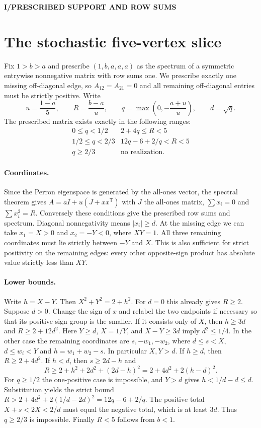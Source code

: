 \documentclass[11pt,a4paper]{article}
\newcommand{\kicker}[1]{\par{\sffamily\bfseries\color{teal}\small #1}\par}
\begin{document}
\clearpage
{}
\kicker{I\quad /\quad PRESCRIBED SUPPORT AND ROW SUMS}
\section*{The stochastic five-vertex slice}
Fix $1>b>a$ and prescribe $(1,b,a,a,a)$ as the spectrum of a symmetric
entrywise nonnegative matrix with row sums one. We prescribe exactly one
missing off-diagonal edge, so $A_{12}=A_{21}=0$ and all remaining
off-diagonal entries must be strictly positive. Write
\[
 u=\frac{1-a}{5},\qquad R=\frac{b-a}{u},\qquad
 q=\max\left(0,-\frac{a+u}{u}\right),\qquad d=\sqrt q.
\]
The prescribed matrix exists exactly in the following ranges:
\[
\begin{array}{c|l}
 0\le q<1/2 & 2+4q\le R<5\\
 1/2\le q<2/3 & 12q-6+2/q<R<5\\
 q\ge2/3 & \text{no realization}.
\end{array}
\]

\paragraph{Coordinates.}
Since the Perron eigenspace is generated by the all-ones vector,
the spectral theorem gives $A=aI+u(J+xx^{\mathsf T})$ with $J$ the
all-ones matrix, $\sum x_i=0$ and $\sum x_i^2=R$. Conversely these
conditions give the prescribed row sums and spectrum. Diagonal
nonnegativity means $|x_i|\ge d$. At the missing edge we can take
$x_1=X>0$ and $x_2=-Y<0$, where $XY=1$. All three remaining coordinates
must lie strictly between $-Y$ and $X$. This is also sufficient for
strict positivity on the remaining edges: every other opposite-sign
product has absolute value strictly less than $XY$.

\paragraph{Lower bounds.}
Write $h=X-Y$. Then $X^2+Y^2=2+h^2$. For $d=0$ this already gives
$R\ge2$. Suppose $d>0$. Change the sign of $x$ and relabel the two
endpoints if necessary so that its positive sign group is the smaller.
If it consists only of $X$, then $h\ge3d$ and $R\ge2+12d^2$.
Here $Y\ge d$, $X=1/Y$, and $X-Y\ge3d$ imply $d^2\le1/4$.
In the other case the remaining coordinates are $s,-w_1,-w_2$, where
$d\le s<X$, $d\le w_i<Y$ and $h=w_1+w_2-s$. In particular $X,Y>d$.
If $h\ge d$, then $R\ge2+4d^2$. If $h<d$, then $s\ge2d-h$ and
\[
 R\ge 2+h^2+2d^2+(2d-h)^2
   =2+4d^2+2(h-d)^2 .
\]
For $q\ge1/2$ the one-positive case is impossible, and $Y>d$ gives
$h<1/d-d\le d$. Substitution yields the strict bound
$R>2+4d^2+2(1/d-2d)^2=12q-6+2/q$.
The positive total $X+s<2X<2/d$ must equal the negative total,
which is at least $3d$. Thus $q\ge2/3$ is impossible. Finally
$R<5$ follows from $b<1$.
\end{document}
